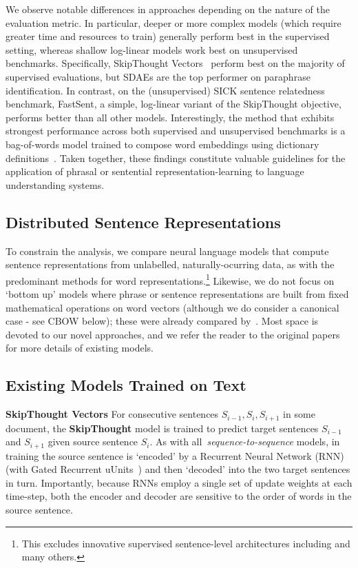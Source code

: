 We observe notable differences in approaches depending on the nature of the evaluation metric. In particular, deeper or more complex models (which require greater time and resources to train) generally perform best in the supervised setting, whereas shallow log-linear models work best on unsupervised benchmarks. Specifically, SkipThought Vectors~\cite{kiros2015skip} perform best on the majority of supervised evaluations, but SDAEs are the top performer on paraphrase identification. In contrast, on the (unsupervised) SICK sentence relatedness benchmark, FastSent, a simple, log-linear variant of the SkipThought objective, performs better than all other models. Interestingly, the method that exhibits strongest performance across both supervised and unsupervised benchmarks is a bag-of-words model trained to compose word embeddings using dictionary definitions~\cite{hill2015learning}. Taken together, these findings constitute valuable guidelines for the application of phrasal or sentential representation-learning to language understanding systems.

\subsection{Distributed Sentence Representations}

To constrain the analysis, we compare neural language models that compute sentence representations from unlabelled, naturally-ocurring data, as with the predominant methods for word representations.\footnote{This excludes innovative supervised sentence-level architectures including \cite{socher2011semi,kalchbrenner2014convolutional} and many others.} Likewise, we do not focus on `bottom up' models where phrase or sentence representations are built from fixed mathematical operations on word vectors (although we do consider a canonical case - see CBOW below); these were already compared by~\cite{milajevs2014evaluating}. Most space is devoted to our novel approaches, and we refer the reader to the original papers for more details of existing models. 

\subsection{Existing Models Trained on Text}
{\bf SkipThought Vectors} For consecutive sentences \(S_{i-1},S_i,S_{i+1}\) in some document, the {\bf SkipThought} model \cite{kiros2015skip} is trained to predict target sentences \(S_{i-1}\) and \(S_{i+1}\) given source sentence \(S_i\). As with all~\emph{sequence-to-sequence} models, in training the source sentence is `encoded' by a Recurrent Neural Network (RNN) (with Gated Recurrent uUnits~\cite{cho2014learning}) and then `decoded' into the two target sentences in turn. Importantly, because RNNs employ a single set of update weights at each time-step, both the encoder and decoder are sensitive to the order of words in the source sentence. 


